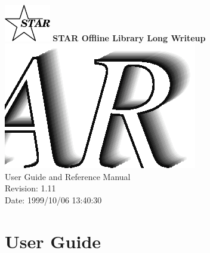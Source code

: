 \documentclass[twoside]{article}
\begin{document}
%
%
\begin{titlepage}
\pagestyle{empty}
\vspace*{-35mm}
\begin{center}
  \mbox{\includegraphics[width=2cm]{StarIcon.eps}}
  {\Large\bf STAR Offline Library Long Writeup}
  \hfill\mbox{}\\[3cm]
  \mbox{\includegraphics[width=\textwidth]{StarClassLibraryTitle.eps}}
  \hfill\mbox{}\\[3cm]
  {\LARGE User Guide and Reference Manual}\\[2cm]
  {\LARGE $ $Revision: 1.11 $ $}  \\[5mm] %
  {\LARGE $ $Date: 1999/10/06 13:40:30 $ $}  %
  \vfill
\end{center}
\cleardoublepage
\end{titlepage}

%
%
\tableofcontents
\cleardoublepage

%
%
\part{User Guide}
\clearpage
\end{document}
